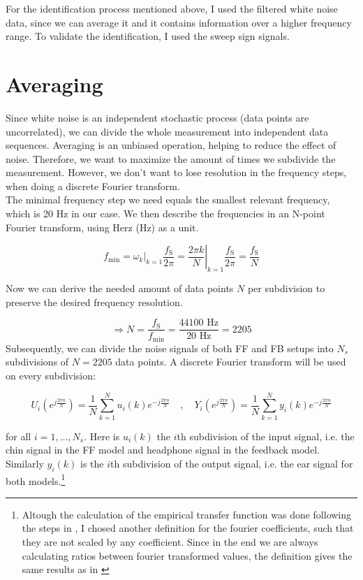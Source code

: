 For the identification process mentioned above, I used the filtered white noise data, since we can average it and it contains information over a higher frequency range. To validate the identification, I used the sweep sign signals.

\section{Averaging}

Since white noise is an independent stochastic process (data points are uncorrelated), we can divide the whole measurement into independent data sequences. Averaging is an unbiased operation, helping to reduce the effect of noise. Therefore, we want to maximize the amount of times we subdivide the measurement. However, we don't want to lose resolution in the frequency steps, when doing a discrete Fourier transform.\\

The minimal frequency step we need equals the smallest relevant frequency, which is 20 Hz in our case. We then describe the frequencies in an N-point Fourier transform, using Herz (Hz) as a unit.

\[ f_\text{min} =\left. \omega_k\right|_{k = 1}\frac{f_\text{S}}{2\pi} = \left. \frac{2\pi k}{N}\right|_{k = 1}\frac{f_\text{S}}{2\pi} = \frac{f_\text{S}}{N} \]

Now we can derive the needed amount of data points $N$ per subdivision to preserve the desired frequency resolution.

\[\Rightarrow N = \frac{f_\text{S}}{f_\text{min}} = \frac{44100 \text{ Hz}}{20 \text{ Hz}} = 2205\]
Subsequently, we can divide the noise signals of both FF and FB setups into $N_s$ subdivisions of $N = 2205$ data points. A discrete Fourier transform will be used on every subdivision:

\[U_i(e^{j\frac{2\pi n}{N}}) = \frac{1}{N}\sum\limits_{k = 1}^{N }u_i(k)e^{-j\frac{2\pi n}{N}} \quad, \quad Y_i(e^{j\frac{2\pi n}{N}}) = \frac{1}{N}\sum\limits_{k = 1}^{N }y_i(k)e^{-j\frac{2\pi n}{N}}\]

for all $i = 1, ..., N_s$. Here is $u_i(k)$ the $i$th subdivision of the input signal, i.e. the chin signal in the FF model and headphone signal in the feedback model. Similarly $y_i(k)$ is the $i$th subdivision of the output signal, i.e. the ear signal for both models.\footnote[2]{Altough the calculation of the empirical transfer function was done following the steps in \cite{ljung1999system}, I chosed another definition for the fourier coefficients, such that they are not scaled by any coefficient. Since in the end we are always calculating ratios between fourier transformed values, the definition gives the same results as in  \cite{ljung1999system}} \\

